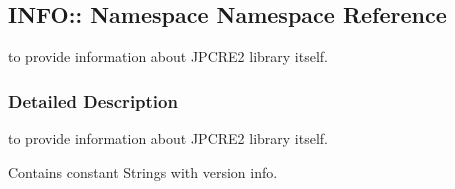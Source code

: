 \hypertarget{namespaceINFO_1_1
Namespace}{}\subsection{I\+N\+FO\+:\+: Namespace Namespace Reference}
\label{namespaceINFO_1_1
Namespace}


to provide information about J\+P\+C\+R\+E2 library itself.  




\subsubsection{Detailed Description}
to provide information about J\+P\+C\+R\+E2 library itself. 

Contains constant Strings with version info. 